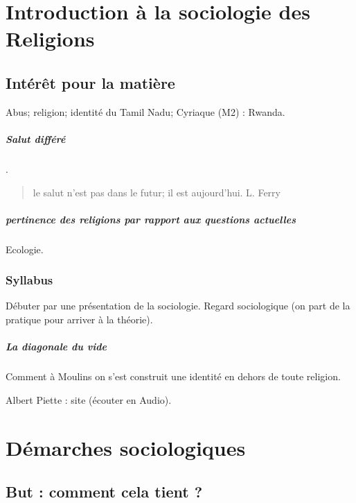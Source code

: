 \chapter{Introduction à la sociologie des Religions}



\section{Intérêt pour la matière}

Abus; religion; identité du Tamil Nadu; 
Cyriaque (M2) : Rwanda.

\paragraph{Salut différé} .
\begin{quote}
    le salut n'est pas dans le futur; il est aujourd'hui. L. Ferry
\end{quote}
\paragraph{pertinence des religions par rapport aux questions actuelles} Ecologie.


\subsection{Syllabus}

Débuter par une présentation de la sociologie. Regard sociologique (on part de la pratique pour arriver à la théorie).
\paragraph{La diagonale du vide} Comment à Moulins on s'est construit une identité en dehors de toute religion.



Albert Piette : site (écouter en Audio). 



\chapter{Démarches sociologiques}

\section{But : comment cela tient ?}

